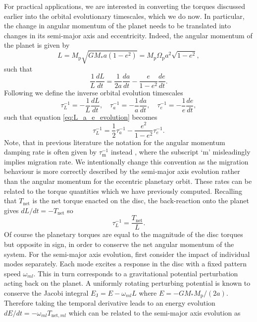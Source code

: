 For practical applications, we are interested in converting the torques discussed earlier into the orbital evolutionary timescales, which we do now. In particular, the change in angular momentum of the planet needs to be translated into changes in its semi-major axis and eccentricity. Indeed, the angular momentum of the planet is given by
%
\begin{equation}
\label{eq:AM_planet}
    L = M_\textrm{p}\sqrt{GM_* a (1-e^2)} = M_\textrm{p}\Omega_\textrm{p} a^2 \sqrt{1-e^2} ,
\end{equation}
%
such that 
%
\begin{equation}
\label{eq:L_a_e_evolution}
    \frac{1}{L}\frac{dL}{dt} = \frac{1}{2a}\frac{da}{dt}-\frac{e}{1-e^2}\frac{de}{dt}.
\end{equation}
%
Following \cite{IdaEtAl_2020} we define the inverse orbital evolution timescales
%
\begin{equation}
\label{eq:inverse_timescales}
    \tau_{L}^{-1} = -\frac{1}{L}\frac{dL}{dt} , \quad \tau_{a}^{-1} = -\frac{1}{a}\frac{da}{dt} , \quad \tau_{e}^{-1} = -\frac{1}{e}\frac{de}{dt},
\end{equation}
%
such that equation \eqref{eq:L_a_e_evolution} becomes
%
\begin{equation}
\label{eq:timescale_relation}
    \tau_{L}^{-1} = \frac{1}{2}\tau_{a}^{-1}-\frac{e^2}{1-e^2}\tau_{e}^{-1}.
\end{equation}
%
Note, that in previous literature the notation for the angular momentum damping rate is often given by $\tau_\textrm{m}^{-1}$ instead \cite[e.g.][]{PapaloizouLarwood_2000,IdaEtAl_2020}, where the subscript `\textrm{m}' misleadingly implies migration rate. We intentionally change this convention as the migration behaviour is more correctly described by the semi-major axis evolution rather than the angular momentum for the eccentric planetary orbit. These rates can be related to the torque quantities which we have previously computed. Recalling that $T_\textrm{net}$ is the net torque enacted on the disc, the back-reaction onto the planet gives $dL/dt = -T_\textrm{net}$ so
%
\begin{equation}
\tau_{L}^{-1} = \frac{T_\textrm{net}}{L}.
\end{equation}
%
Of course the planetary torques are equal to the magnitude of the disc torques but opposite in sign, in order to conserve the net angular momentum of the system. For the semi-major axis evolution, first consider the impact of individual modes separately. Each mode excites a response in the disc with a fixed pattern speed $\omega_{ml}$. This in turn corresponds to a gravitational potential perturbation acting back on the planet. A uniformly rotating perturbing potential is known to conserve the Jacobi integral $E_\textrm{J} = E-\omega_{ml}L$ where $E = -GM_* M_\textrm{p}/(2a)$. Therefore taking the temporal derivative leads to an energy evolution $dE/dt = -\omega_{ml}T_{\textrm{net},ml}$ which can be related to the semi-major axis evolution as
